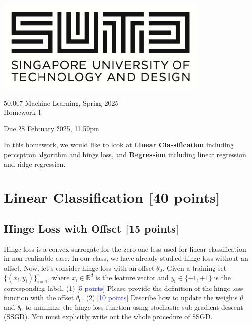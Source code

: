 \documentclass[11pt]{article}
\begin{document}
\begin{center}
\includegraphics[scale=0.25]{sutd.png}
\end{center}


\begin{center}
{{50.007 Machine Learning, Spring 2025\\Homework 1}}
\end{center}

\begin{center}
	{\small Due 28 February 2025, 11.59pm}
\end{center}


In this homework, we would like to look at \textbf{Linear Classification} including perceptron algorithm and hinge loss, and \textbf{Regression} including linear regression and ridge regression. 

\section{Linear Classification [40 points]}
\subsection{Hinge Loss with Offset [15 points]}
Hinge loss is a convex surrogate for the zero-one loss used for linear classification in non-realizable case. In our class, we have already studied hinge loss without an offset. Now, let's consider hinge loss with an offset $\theta_0$. Given a training set $\{(x_i, y_i)\}_{i=1}^{n}$, where $x_i \in \mathbb{R}^d$ is the feature vector and $y_i \in \{-1, +1\}$ is the corresponding label.
\newline
\noindent (1) [\textcolor{blue}{5 points}] Please provide the definition of the hinge loss function with the offset $\theta_0$.  
\newline
\noindent (2) [\textcolor{blue}{10 points}] Describe how to update the weights $\theta$ and $\theta_0$ to minimize the hinge loss function using stochastic sub-gradient descent (SSGD). You must explicitly write out the whole procedure of SSGD.
\newline
\end{document}
